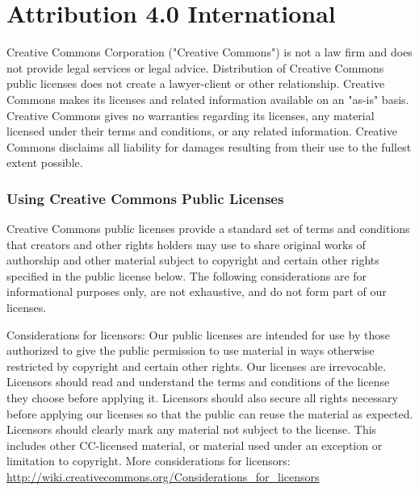 \chapter{Attribution 4.0 International}
\label{license}

\begin{scriptsize}

Creative Commons Corporation ("Creative Commons") is not a law firm and
does not provide legal services or legal advice. Distribution of
Creative Commons public licenses does not create a lawyer-client or
other relationship. Creative Commons makes its licenses and related
information available on an "as-is" basis. Creative Commons gives no
warranties regarding its licenses, any material licensed under their
terms and conditions, or any related information. Creative Commons
disclaims all liability for damages resulting from their use to the
fullest extent possible.

\subsection*{Using Creative Commons Public Licenses}

Creative Commons public licenses provide a standard set of terms and
conditions that creators and other rights holders may use to share
original works of authorship and other material subject to copyright
and certain other rights specified in the public license below. The
following considerations are for informational purposes only, are not
exhaustive, and do not form part of our licenses.

     Considerations for licensors: Our public licenses are
     intended for use by those authorized to give the public
     permission to use material in ways otherwise restricted by
     copyright and certain other rights. Our licenses are
     irrevocable. Licensors should read and understand the terms
     and conditions of the license they choose before applying it.
     Licensors should also secure all rights necessary before
     applying our licenses so that the public can reuse the
     material as expected. Licensors should clearly mark any
     material not subject to the license. This includes other 
	CC-licensed material, or material used under an exception or
     limitation to copyright. More considerations for licensors:
		\url{http://wiki.creativecommons.org/Considerations_for_licensors}


\end{scriptsize}
